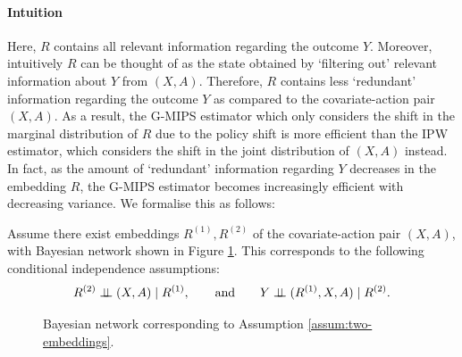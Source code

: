 \paragraph{Intuition}
Here, $R$ contains all relevant information regarding the outcome $Y$. Moreover, intuitively $R$ can be thought of as the state obtained by `filtering out' relevant information about $Y$ from $(X, A)$. Therefore, $R$ contains less `redundant' information regarding the outcome $Y$ as compared to the covariate-action pair $(X, A)$. As a result, the G-MIPS estimator which only considers the shift in the marginal distribution of $R$ due to the policy shift is more efficient than the IPW estimator, which considers the shift in the joint distribution of $(X, A)$ instead.
In fact, as the amount of `redundant' information regarding $Y$ decreases in the embedding $R$, the G-MIPS estimator becomes increasingly efficient with decreasing variance. We formalise this as follows:
\begin{assumption}\label{assum:two-embeddings}
    Assume there exist embeddings $R^{(1)}, R^{(2)}$ of the covariate-action pair $(X, A)$, with Bayesian network shown in Figure \ref{fig:embedding_double}. 
    This corresponds to the following conditional independence assumptions:
    \[
    R^{(2)} \perp \!\!\! \perp (X, A) \mid R^{(1)}, \qquad \textup{and} \qquad Y \perp \!\!\! \perp (R^{(1)}, X, A) \mid R^{(2)}.
    \]
\end{assumption}
\begin{figure}[h!]
\centering
{}
\caption{Bayesian network corresponding to Assumption \ref{assum:two-embeddings}.}
\label{fig:embedding_double}
\end{figure}  
